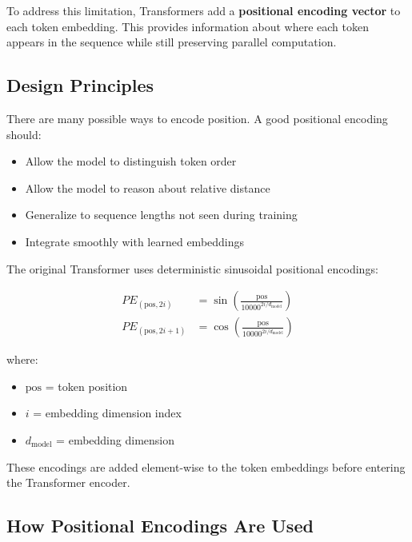 \documentclass[11pt]{article}
\begin{document}
To address this limitation, Transformers add a \textbf{positional encoding vector} to each token embedding. This provides information about where each token appears in the sequence while still preserving parallel computation.

\subsection{Design Principles}

There are many possible ways to encode position. A good positional encoding should:

\begin{itemize}

\item Allow the model to distinguish token order
\item Allow the model to reason about relative distance
\item Generalize to sequence lengths not seen during training
\item Integrate smoothly with learned embeddings

\end{itemize}

The original Transformer uses deterministic sinusoidal positional encodings:

\begin{align}
PE_{(\text{pos}, 2i)}
&=
\sin
\left(
\frac{\text{pos}}{10000^{2i/d_{\text{model}}}}
\right)
\\[6pt]
PE_{(\text{pos}, 2i+1)}
&=
\cos
\left(
\frac{\text{pos}}{10000^{2i/d_{\text{model}}}}
\right)
\end{align}

where:

\begin{itemize}[nosep]

\item $\text{pos}$ = token position
\item $i$ = embedding dimension index
\item $d_{\text{model}}$ = embedding dimension

\end{itemize}

These encodings are added element-wise to the token embeddings before entering the Transformer encoder.

\subsection{How Positional Encodings Are Used}
\end{document}
